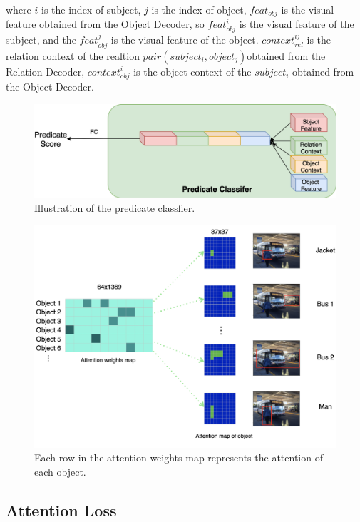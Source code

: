 where $ i $ is the index of subject, $ j $ is the index of object,  $ feat_{obj} $ is the visual feature obtained from the Object Decoder, so $ feat_{obj}^i $ is the visual feature of the subject, and the $ feat_{obj}^j $ is the visual feature of the object. $ context_{rel}^{ij} $ is the relation context of the realtion $ pair(subject_i,object_j)  $obtained from the Relation Decoder, $  context_{obj}^i $ is the object context of the $subject_i$ obtained from the Object Decoder.

 \begin{figure}[tbph!]
 	\centering
 	\includegraphics[width=1\linewidth]{figures/predicate_classifer}
 	\caption[Illustration of the predicate classfier]{Illustration of the predicate classfier.}
 	\label{fig:predicateclassifer}
 \end{figure}
 
 
 \begin{figure}[h]
 	\centering
 	\includegraphics[width=0.9\linewidth]{figures/attention_map}
 	\caption[Illustration of the attention map]{Each row in the attention weights map represents the attention of each object. }
 	\label{fig:attentionmap}
 \end{figure}
 

\subsection{Attention Loss}


